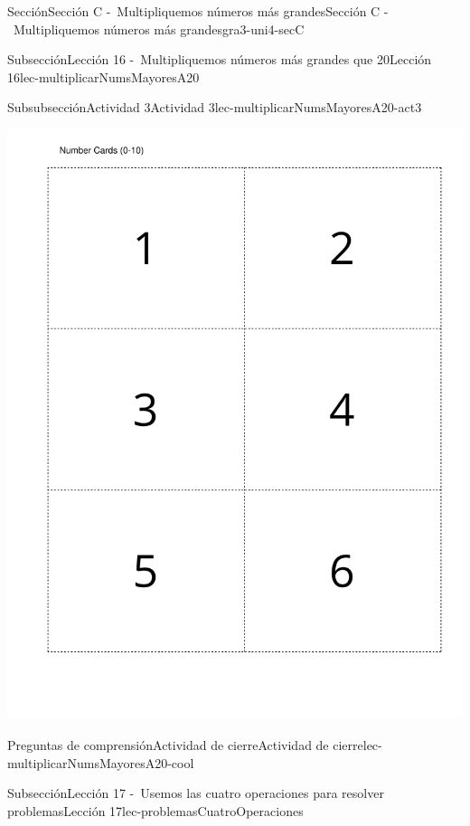 \begin{sectionptx}{Sección}{Sección C -~Multipliquemos números más grandes}{}{Sección C -~Multipliquemos números más grandes}{}{}{gra3-uni4-secC}
\begin{subsectionptx}{Subsección}{Lección 16 -~Multipliquemos números más grandes que 20}{}{Lección 16}{}{}{lec-multiplicarNumsMayoresA20}
\begin{subsubsectionptx}{Subsubsección}{Actividad 3}{}{Actividad 3}{}{}{lec-multiplicarNumsMayoresA20-act3}
\begin{cutoutpage}
\begin{image}{0}{1}{0}{}
\includegraphics[page=4, rotate=90, scale=0.55, trim=40 40 20 40, clip, center] {external/blm/pdf-source/tarjetasDeDigitos.pdf}
\end{image}
\end{cutoutpage}
\end{subsubsectionptx}
%
%
\typeout{************************************************}
\typeout{************************************************}
%
\begin{reading-questions-subsubsection}{Preguntas de comprensión}{Actividad de cierre}{}{Actividad de cierre}{}{}{lec-multiplicarNumsMayoresA20-cool}
%
\end{reading-questions-subsubsection}
\end{subsectionptx}
%
%
\typeout{************************************************}
\typeout{************************************************}
%
\begin{subsectionptx}{Subsección}{Lección 17 -~Usemos las cuatro operaciones para resolver problemas}{}{Lección 17}{}{}{lec-problemasCuatroOperaciones}

\end{subsectionptx}
\end{sectionptx}
